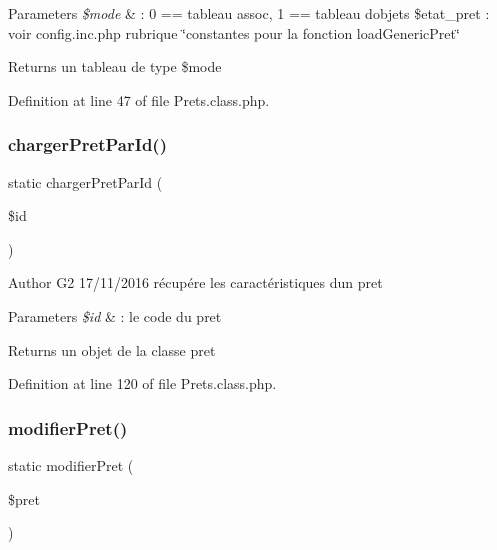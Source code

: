 \begin{DoxyParams}{Parameters}
{\em \$mode} & \+: 0 == tableau assoc, 1 == tableau d\textquotesingle{}objets \$etat\+\_\+pret \+: voir config.\+inc.\+php rubrique \char`\"{}constantes pour la fonction load\+Generic\+Pret\char`\"{} \\
\hline
\end{DoxyParams}
\begin{DoxyReturn}{Returns}
un tableau de type \$mode 
\end{DoxyReturn}


Definition at line 47 of file Prets.\+class.\+php.

\mbox{\label{class_prets_a7ea0e0fc80de1d6df26d9a8e0017ff92}} 
\subsubsection{\texorpdfstring{charger\+Pret\+Par\+Id()}{chargerPretParId()}}
{\footnotesize\ttfamily static charger\+Pret\+Par\+Id (\begin{DoxyParamCaption}\item[{}]{\$id }\end{DoxyParamCaption})\hspace{0.3cm}{\ttfamily [static]}}

\begin{DoxyAuthor}{Author}
G2 17/11/2016 récupére les caractéristiques d\textquotesingle{}un pret 
\end{DoxyAuthor}

\begin{DoxyParams}{Parameters}
{\em \$id} & \+: le code du pret \\
\hline
\end{DoxyParams}
\begin{DoxyReturn}{Returns}
un objet de la classe pret 
\end{DoxyReturn}


Definition at line 120 of file Prets.\+class.\+php.

\mbox{\label{class_prets_a71f7b77d9ff38020ab022389dda0e226}} 
\subsubsection{\texorpdfstring{modifier\+Pret()}{modifierPret()}}
{\footnotesize\ttfamily static modifier\+Pret (\begin{DoxyParamCaption}\item[{}]{\$pret }\end{DoxyParamCaption})\hspace{0.3cm}{\ttfamily [static]}}



